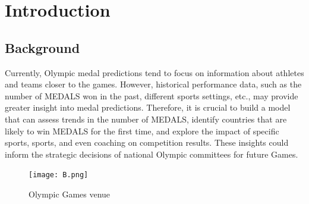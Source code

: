 \documentclass{mcmthesis}  %
\let\oldtableofcontents=\tableofcontents
\renewcommand{\tableofcontents}{
        \begingroup
        \setstretch{0.5} %
        \oldtableofcontents
        \endgroup
    }
\begin{document}
\maketitle  %

\tableofcontents  %


\newpage  %
\section{Introduction}  %

\subsection{Background}  %

\hspace*{1.5em}Currently, Olympic medal predictions tend to focus on information about athletes and teams closer to the games. However, historical performance data, such as the number of MEDALS won in the past, different sports settings, etc., may provide greater insight into medal predictions. Therefore, it is crucial to build a model that can assess trends in the number of MEDALS, identify countries that are likely to win MEDALS for the first time, and explore the impact of specific sports, sports, and even coaching on competition results. These insights could inform the strategic decisions of national Olympic committees for future Games.
\begin{figure}[h]  %
\small
\centering  %
\texttt{[image: B.png]}  %
\caption{Olympic Games venue}  %
\end{figure}  %
\end{document}
